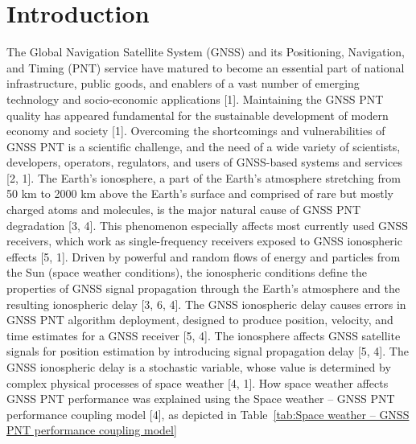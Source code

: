 \documentclass[sn-mathphys-num]{sn-jnl}%
\begin{document}



\maketitle

\section{Introduction}

The Global Navigation Satellite System (GNSS) and its Positioning, Navigation, and Timing (PNT) service have matured to become an essential part of national infrastructure, public goods, and enablers of a vast number of emerging technology and socio-economic applications [1]. Maintaining the GNSS PNT quality has appeared fundamental for the sustainable development of modern economy and society [1]. Overcoming the shortcomings and vulnerabilities of GNSS PNT is a scientific challenge, and the need of a wide variety of scientists, developers, operators, regulators, and users of GNSS-based systems and services [2, 1]. The Earth’s ionosphere, a part of the Earth’s atmosphere stretching from 50 km to 2000 km above the Earth’s surface and comprised of rare but mostly charged atoms and molecules, is the major natural cause of GNSS PNT degradation [3, 4]. This phenomenon especially affects most currently used GNSS receivers, which work as single-frequency receivers exposed to GNSS ionospheric effects [5, 1]. Driven by powerful and random flows of energy and particles from the Sun (space weather conditions), the ionospheric conditions define the properties of GNSS signal propagation through the Earth’s atmosphere and the resulting ionospheric delay [3, 6, 4]. The GNSS ionospheric delay causes errors in GNSS PNT algorithm deployment, designed to produce position, velocity, and time estimates for a GNSS receiver [5, 4]. The ionosphere affects GNSS satellite signals for position estimation by introducing signal propagation delay [5, 4]. The GNSS ionospheric delay is a stochastic variable, whose value is determined by complex physical processes of space weather [4, 1]. How space weather affects GNSS PNT performance was explained using the Space weather – GNSS PNT performance coupling model [4], as depicted in Table~\ref{tab:Space weather – GNSS PNT performance coupling model}
\end{document}
